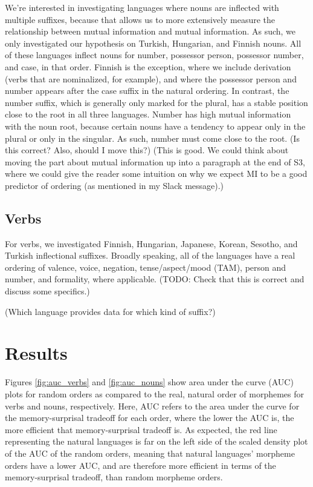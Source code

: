 \documentclass[11pt,letterpaper]{article}
\newcommand\mhahn[1]{{\color{red}(#1)}}
\newcommand\becky[1]{{\color{blue}(#1)}}
\begin{document}
We're interested in investigating languages where nouns are inflected with multiple suffixes, because that allows us to more extensively measure the relationship between mutual information and mutual information. As such, we only investigated our hypothesis on Turkish, Hungarian, and Finnish nouns. All of these languages inflect nouns for number, possessor person, possessor number, and case, in that order. Finnish is the exception, where we include derivation (verbs that are nominalized, for example), and where the possessor person and number appears after the case suffix in the natural ordering. 
In contrast, the number suffix, which is generally only marked for the plural, has a stable position close to the root in all three languages. Number has high mutual information with the noun root, because certain nouns have a tendency to appear only in the plural or only in the singular. As such, number must come close to the root. \becky{Is this correct? Also, should I move this?}
\mhahn{This is good. We could think about moving the part about mutual information up into a paragraph at the end of S3, where we could give the reader some intuition on why we expect MI to be a good predictor of ordering (as mentioned in my Slack message).}


\subsection{Verbs}
For verbs, we investigated Finnish, Hungarian, Japanese, Korean, Sesotho, and Turkish inflectional suffixes. Broadly speaking, all of the languages have a real ordering of valence, voice, negation, tense/aspect/mood (TAM), person and number, and formality, where applicable. \becky{TODO: Check that this is correct and discuss some specifics.} 

\becky{Which language provides data for which kind of suffix?}




\section{Results}
Figures \ref{fig:auc_verbs} and \ref{fig:auc_nouns} show area under the curve (AUC) plots for random orders as compared to the real, natural order of morphemes for verbs and nouns, respectively. Here, AUC refers to the area under the curve for the memory-surprisal tradeoff for each order, where the lower the AUC is, the more efficient that memory-surprisal tradeoff is. As expected, the red line representing the natural languages is far on the left side of the scaled density plot of the AUC of the random orders, meaning that natural languages' morpheme orders have a lower AUC, and are therefore more efficient in terms of the memory-surprisal tradeoff, than random morpheme orders. 
\end{document}
